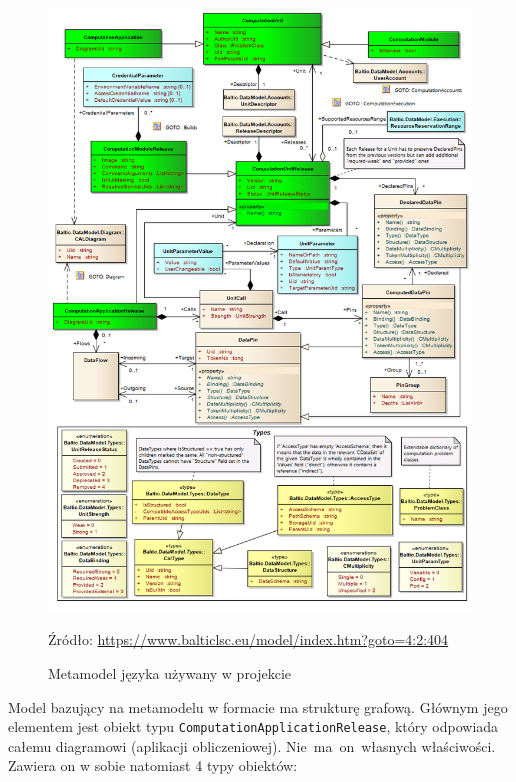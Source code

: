 \begin{figure}[!ht]
	\centering


	\includegraphics[width=0.82\linewidth]{./images/cal-metamodel-balticlsc.png}
	\caption{Metamodel języka \CAL{} używany w projekcie
		\BalticLSC{}}\label{rys:cal-metamodel-balticlsc}

	\medskip
	{\small Źródło:
		\url{https://www.balticlsc.eu/model/index.htm?goto=4:2:404}}
\end{figure}

Model bazujący na metamodelu w formacie \Ecore{} ma strukturę grafową. Głównym
jego elementem jest obiekt typu
\texttt{Computation\-Application\-Release}, który odpowiada całemu diagramowi
(aplikacji obliczeniowej). Nie~ma~on~własnych właściwości. Zawiera on w sobie
natomiast 4 typy obiektów:

